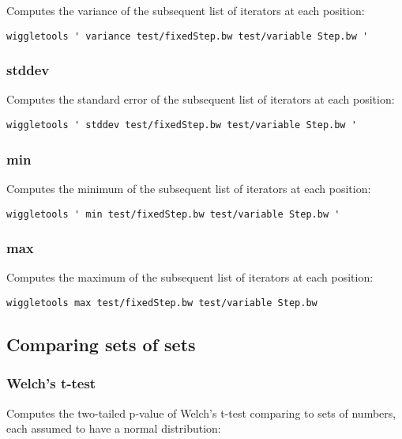\documentclass[12pt]{article}
\begin{document}
Computes the variance of the subsequent list of iterators at each position:

\begin{verbatim}
wiggletools ' variance test/fixedStep.bw test/variable Step.bw '
\end{verbatim}

\subsubsection{stddev}

Computes the standard error of the subsequent list of iterators at each position:

\begin{verbatim}
wiggletools ' stddev test/fixedStep.bw test/variable Step.bw '
\end{verbatim}

\subsubsection{min}


Computes the minimum of the subsequent list of iterators at each position:

\begin{verbatim}
wiggletools ' min test/fixedStep.bw test/variable Step.bw '
\end{verbatim}

\subsubsection{max}

Computes the maximum of the subsequent list of iterators at each position:

\begin{verbatim}
wiggletools max test/fixedStep.bw test/variable Step.bw 
\end{verbatim}

\subsection{Comparing sets of sets}

\subsubsection{Welch's t-test}

Computes the two-tailed p-value of Welch's t-test comparing to sets of numbers, each assumed to have a normal distribution:
\end{document}

